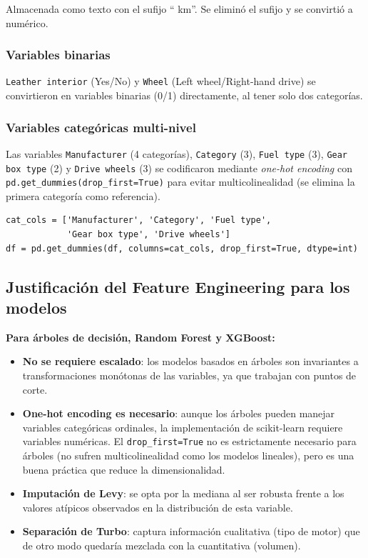 \documentclass[12pt,a4paper]{article}
\begin{document}
Almacenada como texto con el sufijo `` km''. Se eliminó el sufijo y se convirtió a numérico.

\subsubsection{Variables binarias}

\texttt{Leather interior} (Yes/No) y \texttt{Wheel} (Left wheel/Right-hand drive) se convirtieron en variables binarias (0/1) directamente, al tener solo dos categorías.

\subsubsection{Variables categóricas multi-nivel}

Las variables \texttt{Manufacturer} (4 categorías), \texttt{Category} (3), \texttt{Fuel type} (3), \texttt{Gear box type} (2) y \texttt{Drive wheels} (3) se codificaron mediante \textit{one-hot encoding} con \texttt{pd.get\_dummies(drop\_first=True)} para evitar multicolinealidad (se elimina la primera categoría como referencia).

\begin{lstlisting}[caption={One-hot encoding de variables categóricas}]
cat_cols = ['Manufacturer', 'Category', 'Fuel type',
            'Gear box type', 'Drive wheels']
df = pd.get_dummies(df, columns=cat_cols, drop_first=True, dtype=int)
\end{lstlisting}

\subsection{Justificación del Feature Engineering para los modelos}

\textbf{Para árboles de decisión, Random Forest y XGBoost:}
\begin{itemize}
    \item \textbf{No se requiere escalado}: los modelos basados en árboles son invariantes a transformaciones monótonas de las variables, ya que trabajan con puntos de corte.
    \item \textbf{One-hot encoding es necesario}: aunque los árboles pueden manejar variables categóricas ordinales, la implementación de scikit-learn requiere variables numéricas. El \texttt{drop\_first=True} no es estrictamente necesario para árboles (no sufren multicolinealidad como los modelos lineales), pero es una buena práctica que reduce la dimensionalidad.
    \item \textbf{Imputación de Levy}: se opta por la mediana al ser robusta frente a los valores atípicos observados en la distribución de esta variable.
    \item \textbf{Separación de Turbo}: captura información cualitativa (tipo de motor) que de otro modo quedaría mezclada con la cuantitativa (volumen).
\end{itemize}
\end{document}
